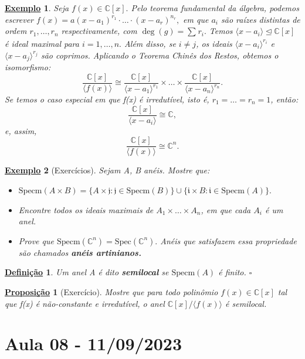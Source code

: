 \documentclass{article}
\newtheorem*{def*}{\underline{Defini\c c\~ao}}
\newtheorem*{prop*}{\underline{Proposi\c c\~ao}}
\newtheorem{example}{\underline{Exemplo}}
\begin{document}
\begin{example}
  Seja \(f(x)\in \mathbb{C}[x].\) Pelo teorema fundamental da álgebra, podemos escrever \(f(x) = a(x-a_{1})^{r_{1}}\cdot \dotsc \cdot (x-a_{r})^{n_{r}},\)
  em que \(a_{i}\) são raízes distintas de ordem \(r_{1}, \dotsc, r_{n}\) respectivamente, com \(\deg{(g)} = \sum\limits_{}^{}r_{i}.\) Temos
  \(\langle x-a_{i} \rangle \trianglelefteq{\mathbb{C}[x]}\) é ideal maximal para \(i=1, \dotsc, n.\) Além disso, se \(i\neq j\), os ideais
  \(\langle x-a_{i} \rangle^{r_{i}}\) e \(\langle x-a_{j} \rangle^{r_{j}}\) são coprimos. Aplicando o Teorema Chinês dos Restos, obtemos o isomorfismo:
  \[
    \frac{\mathbb{C}[x]}{\langle f(x) \rangle}\cong \frac{\mathbb{C}[x]}{\langle x-a_{1} \rangle^{r_{1}}}\times \dotsc\times \frac{\mathbb{C}[x]}{\langle x-a_{n} \rangle^{r_{n}}}.    
  \]
  Se temos o caso especial em que f(x) é irredutível, isto é, \(r_{1} = \dotsc = r_{n} = 1\), então:
  \[
    \frac{\mathbb{C}[x]}{\langle x-a_{i} \rangle}\cong{\mathbb{C}},
  \]
  e, assim, 
  \[
    \frac{\mathbb{C}[x]}{\langle f(x) \rangle}\cong{\mathbb{C}^{n}}.
  \]
\end{example}
\begin{example}[Exercícios]
  Sejam A, B anéis. Mostre que:
  \begin{itemize}
    \item[1)] \(\mathrm{Specm}(A\times B) = \{A\times \mathfrak{j}:\mathfrak{j}\in \mathrm{Specm}(B)\}\cup\{\mathfrak{i}\times B:\mathfrak{i}\in \mathrm{Specm}(A)\}.\)
    \item[2)] Encontre todos os ideais maximais de \(A_{1}\times \dotsc\times A_{n}\), em que cada
      \(A_{i}\) é um anel.
    \item[3)] Prove que \(\mathrm{Specm}(\mathbb{C}^{n}) = \mathrm{Spec}(\mathbb{C}^{n}).\) Anéis que satisfazem essa propriedade
      são chamados \textbf{anéis artinianos.}
  \end{itemize}
\end{example}
\begin{def*}
  Um anel A é dito \textbf{semilocal} se \(\mathrm{Specm}(A)\) é finito. \(\square\)
\end{def*}
\begin{prop*}[Exercício]
  Mostre que para todo polinômio \(f(x)\in \mathbb{C}[x]\) tal que f(x) é não-constante e irredutível, o anel
  \(\mathbb{C}[x]/\langle f(x) \rangle\) é semilocal.
\end{prop*}
\newpage

\section{Aula 08 - 11/09/2023}
\end{document}
